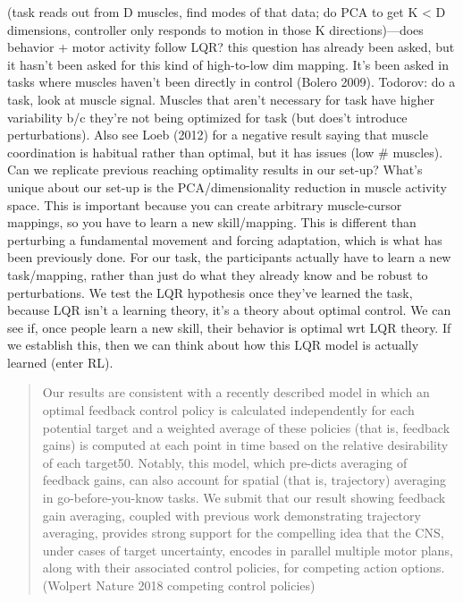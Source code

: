 \documentclass[../main.tex]{subfiles}
\begin{document}
(task reads out from D muscles, find modes of that data; do PCA to get K \textless{} D dimensions, controller only responds to motion in those K directions)---does behavior + motor activity follow LQR? this question has already been asked, but it hasn't been asked for this kind of high-to-low dim mapping. It's been asked in tasks where muscles haven't been directly in control (Bolero 2009). Todorov: do a task, look at muscle signal. Muscles that aren't necessary for task have higher variability b/c they're not being optimized for task (but does't introduce perturbations). Also see Loeb (2012) for a negative result saying that muscle coordination is habitual rather than optimal, but it has issues (low \# muscles). Can we replicate previous reaching optimality results in our set-up? What's unique about our set-up is the PCA/dimensionality reduction in muscle activity space. This is important because you can create arbitrary muscle-cursor mappings, so you have to learn a new skill/mapping. This is different than perturbing a fundamental movement and forcing adaptation, which is what has been previously done. For our task, the participants actually have to learn a new task/mapping, rather than just do what they already know and be robust to perturbations. We test the LQR hypothesis once they've learned the task, because LQR isn't a learning theory, it's a theory about optimal control. We can see if, once people learn a new skill, their behavior is optimal wrt LQR theory. If we establish this, then we can think about how this LQR model is actually learned (enter RL).

\begin{quote}
Our results are consistent with a recently described model in which an optimal feedback control policy is calculated independently for each potential target and a weighted average of these policies (that is, feedback gains) is computed at each point in time based on the relative desirability of each target50. Notably, this model, which pre-dicts averaging of feedback gains, can also account for spatial (that is, trajectory) averaging in go-before-you-know tasks. We submit that our result showing feedback gain averaging, coupled with previous work demonstrating trajectory averaging, provides strong support for the compelling idea that the CNS, under cases of target uncertainty, encodes in parallel multiple motor plans, along with their associated control policies, for competing action options. (Wolpert Nature 2018 competing control policies)
\end{quote}
\end{document}
